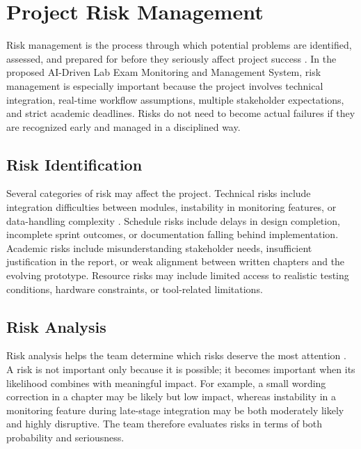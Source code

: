 \section{Project Risk Management}

Risk management is the process through which potential problems are identified, assessed, and prepared for before they seriously affect project success \cite{risk1}. In the proposed AI-Driven Lab Exam Monitoring and Management System, risk management is especially important because the project involves technical integration, real-time workflow assumptions, multiple stakeholder expectations, and strict academic deadlines. Risks do not need to become actual failures if they are recognized early and managed in a disciplined way.

\subsection{Risk Identification}

Several categories of risk may affect the project. Technical risks include integration difficulties between modules, instability in monitoring features, or data-handling complexity \cite{facerec1}. Schedule risks include delays in design completion, incomplete sprint outcomes, or documentation falling behind implementation. Academic risks include misunderstanding stakeholder needs, insufficient justification in the report, or weak alignment between written chapters and the evolving prototype. Resource risks may include limited access to realistic testing conditions, hardware constraints, or tool-related limitations.

\subsection{Risk Analysis}

Risk analysis helps the team determine which risks deserve the most attention \cite{risk1}. A risk is not important only because it is possible; it becomes important when its likelihood combines with meaningful impact. For example, a small wording correction in a chapter may be likely but low impact, whereas instability in a monitoring feature during late-stage integration may be both moderately likely and highly disruptive. The team therefore evaluates risks in terms of both probability and seriousness.


